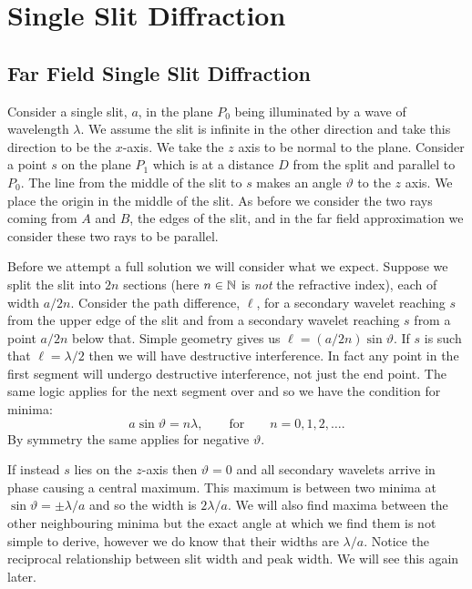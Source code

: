 \documentclass[a4paper]{article}
\begin{document}
    \section{Single Slit Diffraction}
    \subsection{Far Field Single Slit Diffraction}
    Consider a single slit, \(a\), in the plane \(P_0\) being illuminated by a wave of wavelength \(\lambda\).
    We assume the slit is infinite in the other direction and take this direction to be the \(x\)-axis.
    We take the \(z\) axis to be normal to the plane.
    Consider a point \(s\) on the plane \(P_1\) which is at a distance \(D\) from the split and parallel to \(P_0\).
    The line from the middle of the slit to \(s\) makes an angle \(\vartheta\) to the \(z\) axis.
    We place the origin in the middle of the slit.
    As before we consider the two rays coming from \(A\) and \(B\), the edges of the slit, and in the far field approximation we consider these two rays to be parallel.
    
    Before we attempt a full solution we will consider what we expect.
    Suppose we split the slit into \(2n\) sections (here \(n\in\mathbb{N}\) is \emph{not} the refractive index), each of width \(a/2n\).
    Consider the path difference, \(\ell\), for a secondary wavelet reaching \(s\) from the upper edge of the slit and from a secondary wavelet reaching \(s\) from a point \(a/2n\) below that.
    Simple geometry gives us \(\ell = (a/2n)\sin\vartheta\).
    If \(s\) is such that \(\ell = \lambda/2\) then we will have destructive interference.
    In fact any point in the first segment will undergo destructive interference, not just the end point.
    The same logic applies for the next segment over and so we have the condition for minima:
    \[a\sin\vartheta = n\lambda, \qquad\text{for}\qquad n = 0, 1, 2, \dotsc.\]
    By symmetry the same applies for negative \(\vartheta\).
    
    If instead \(s\) lies on the \(z\)-axis then \(\vartheta = 0\) and all secondary wavelets arrive in phase causing a central maximum.
    This maximum is between two minima at \(\sin\vartheta = \pm \lambda/a\) and so the width is \(2\lambda/a\).
    We will also find maxima between the other neighbouring minima but the exact angle at which we find them is not simple to derive, however we do know that their widths are \(\lambda/a\).
    Notice the reciprocal relationship between slit width and peak width.
    We will see this again later.
    
\end{document}
